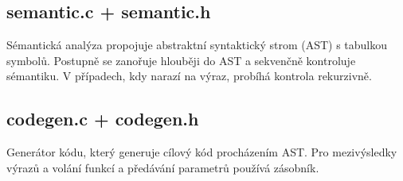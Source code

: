 \subsection*{semantic.c + semantic.h}
Sémantická analýza propojuje abstraktní syntaktický strom (AST) s tabulkou symbolů.
Postupně se zanořuje hlouběji do AST a sekvenčně kontroluje sémantiku. V případech, kdy narazí na výraz, probíhá kontrola rekurzivně.

\subsection*{codegen.c + codegen.h}
Generátor kódu, který generuje cílový kód procházením AST. Pro mezivýsledky výrazů a volání funkcí a předávání parametrů používá zásobník.
